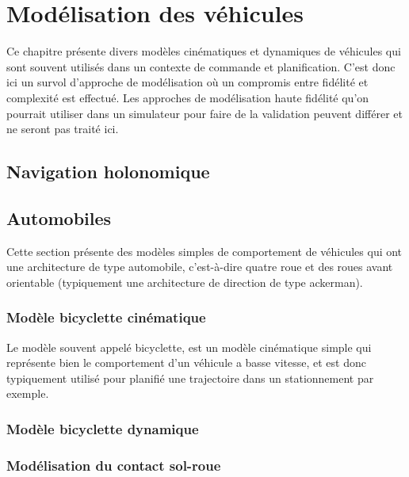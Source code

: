 \chapter{Modélisation des véhicules}

Ce chapitre présente divers modèles cinématiques et dynamiques de véhicules qui sont souvent utilisés dans un contexte de commande et planification. C'est donc ici un survol d'approche de modélisation où un compromis entre fidélité et complexité est effectué. Les approches de modélisation haute fidélité qu'on pourrait utiliser dans un simulateur pour faire de la validation peuvent différer et ne seront pas traité ici.


\section{Navigation holonomique}



\section{Automobiles}

Cette section présente des modèles simples de comportement de véhicules qui ont une architecture de type automobile, c'est-à-dire quatre roue et des roues avant orientable (typiquement une architecture de direction de type ackerman).

\subsection{Modèle bicyclette cinématique}

Le modèle souvent appelé bicyclette, est un modèle cinématique simple qui représente bien le comportement d'un véhicule a basse vitesse, et est donc typiquement utilisé pour planifié une trajectoire dans un stationnement par exemple.


\subsection{Modèle bicyclette dynamique}


\subsection{Modélisation du contact sol-roue}


